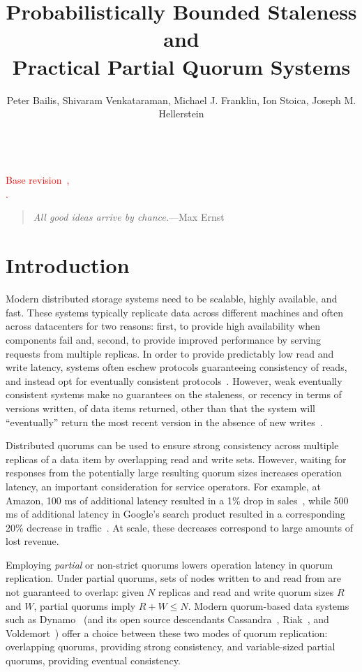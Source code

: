 \documentclass{vldb}
\title{Probabilistically Bounded Staleness and\\ Practical Partial Quorum Systems}
\author{Peter Bailis, Shivaram Venkataraman, Michael J. Franklin, Ion Stoica, Joseph M. Hellerstein\\
\affaddr{University of California, Berkeley}\\
\affaddr{\{pbailis, shivaram, franklin, stoica, hellerstein\}@cs.berkeley.edu}}
\begin{document}

\maketitle


\noindent\textcolor{red}{Base revision~\GITAbrHash,~\GITAuthorDate\\\GITAuthorName.}

\begin{quote}
\textit{All good ideas arrive by chance.}---Max Ernst
\end{quote}



\section{Introduction}

Modern distributed storage systems need to be scalable, highly
available, and fast.  These systems typically replicate data across
different machines and often across datacenters for two reasons:
first, to provide high availability when components fail and, second,
to provide improved performance by serving requests from multiple
replicas.  In order to provide predictably low read and write latency,
systems often eschew protocols guaranteeing consistency of reads, and
instead opt for eventually consistent
protocols~\cite{cassandradefault, abadilatconsist, dynamo, feinbergpc,
  reddit, riaktalkone, outbrain}.  However, weak eventually consistent
systems make no guarantees on the staleness, or recency in terms of
versions written, of data items returned, other than that the system
will ``eventually'' return the most recent version in the absence of
new writes~\cite{vogels-defs}.

Distributed quorums can be used to ensure strong consistency across
multiple replicas of a data item by overlapping read and write
sets. However, waiting for responses from the potentially large
resulting quorum sizes increases operation latency, an important
consideration for service operators. For example, at Amazon, 100 ms of
additional latency resulted in a 1\% drop in
sales~\cite{amazon-latency}, while 500 ms of additional latency in
Google's search product resulted in a corresponding 20\% decrease in
traffic~\cite{google-talk}.  At scale, these decreases correspond to
large amounts of lost revenue.

Employing \textit{partial} or non-strict quorums lowers operation
latency in quorum replication.  Under partial quorums, sets of nodes
written to and read from are not guaranteed to overlap: given $N$
replicas and read and write quorum sizes $R$ and $W$, partial quorums
imply $R+W \leq N$.  Modern quorum-based data systems such as
Dynamo~\cite{dynamo} (and its open source descendants
Cassandra~\cite{cassandra}, Riak~\cite{riak}, and
Voldemort~\cite{voldemort}) offer a choice between these two modes of
quorum replication: overlapping quorums, providing strong consistency,
and variable-sized partial quorums, providing eventual consistency.
\end{document}
